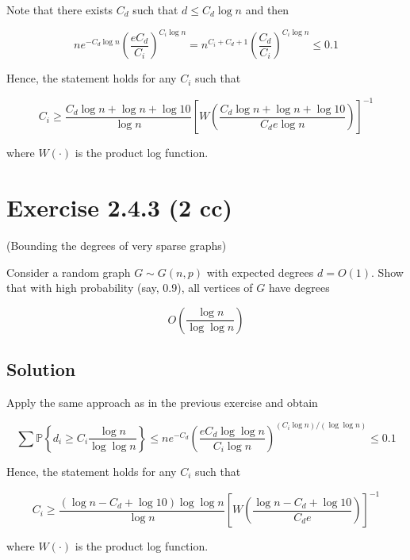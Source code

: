 \documentclass{article}
\begin{document}
Note that there exists $C_d$ such that $d \leq C_d \log n$ and then

$$n e^{-C_d \log n} \left(\frac{e C_d}{C_i}\right)^{C_i \log n} = n^{C_i + C_d + 1} \left(\frac{C_d}{C_i}\right)^{C_i \log n} \leq 0.1$$

Hence, the statement holds for any $C_i$ such that

$$C_i \geq \frac{C_d \log n + \log n + \log 10}{\log n } \left[W \left(\frac{C_d \log n + \log n + \log 10}{C_d e \log n}\right)\right]^{-1}$$

where $W(\cdot)$ is the product log function.

\section{Exercise 2.4.3 (2 cc)}

(Bounding the degrees of very sparse graphs)

Consider a random graph $G \sim G(n, p)$ with expected degrees $d = O(1)$. Show that with high probability (say, 0.9), all vertices of $G$ have degrees

$$O\left(\frac{\log n}{\log \log n}\right)$$

\subsection{Solution}

Apply the same approach as in the previous exercise and obtain

$$ \sum \mathbb P \left\{ d_i \geq C_i \frac{\log n}{\log \log n} \right\} \leq n e^{-C_d} \left(\frac{e C_d \log \log n}{C_i \log n}\right)^{(C_i \log n) / (\log \log n)} \leq 0.1$$

Hence, the statement holds for any $C_i$ such that

$$C_i \geq \frac{(\log n - C_d + \log 10)\log \log n}{\log n} \left[W\left( \frac{\log n - C_d + \log 10}{C_d e} \right)\right]^{-1}$$

where $W(\cdot)$ is the product log function.
\end{document}
